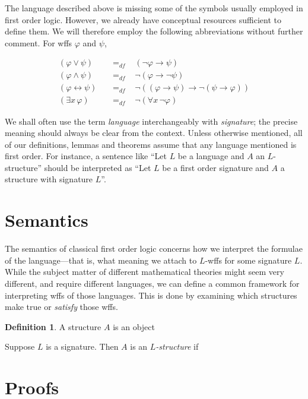 \documentclass[10pt, a4paper, oneside]{article}
\theoremstyle{definition}
\newtheorem{dfn}[thm]{Definition}
\theoremstyle{remark}
\theoremstyle{plain}
\newcommand{\defspace}[1]{\hspace{#1} &=_{df} \hspace{#1}}
\begin{document}
The language described above is missing some of the symbols usually employed in
first order logic. However, we already have conceptual resources sufficient to
define them. We will therefore employ the following abbreviations without
further comment. For wffs $\varphi$ and $\psi$,

\begin{align*}
    (\varphi \vee \psi) \defspace{10pt} (\neg \varphi \rightarrow \psi) \\
    (\varphi \wedge \psi) \defspace{10pt} \neg (\varphi \rightarrow \neg\psi) \\
    (\varphi \leftrightarrow \psi) \defspace{10pt}
        \neg (
            (\varphi \rightarrow \psi)
            \rightarrow
            \neg (\psi \rightarrow \varphi)
        ) \\
    (\exists{x} \, \varphi) \defspace{10pt} \neg (\forall{x} \, \neg\varphi)
\end{align*}

We shall often use the term \emph{language} interchangeably with
\emph{signature}; the precise meaning should always be clear from the context.
Unless otherwise mentioned, all of our definitions, lemmas and theorems assume
that any language mentioned is first order. For instance, a sentence like ``Let
$L$ be a language and $A$ an $L$-structure'' should be interpreted as ``Let $L$
be a first order signature and $A$ a structure with signature $L$''.


\section{Semantics}

The semantics of classical first order logic concerns how we interpret the
formulae of the language---that is, what meaning we attach to $L$-wffs for some
signature $L$. While the subject matter of different mathematical theories might
seem very different, and require different languages, we can define a common
framework for interpreting wffs of those languages. This is done by examining
which structures make true or \emph{satisfy} those wffs.

\begin{dfn}
    A structure $A$ is an object
    
    Suppose $L$ is a signature. Then $A$ is an \emph{$L$-structure} if
\end{dfn}


\section{Proofs}
\end{document}
